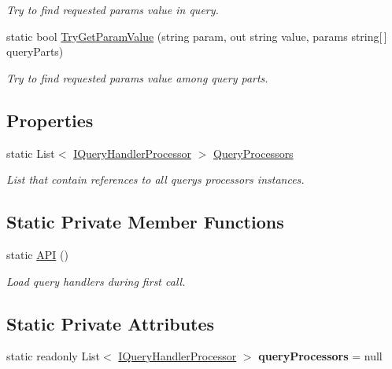 \begin{DoxyCompactItemize}
\begin{DoxyCompactList}\small\item\em Try to find requested param\textquotesingle{}s value in query. \end{DoxyCompactList}\item 
static bool \mbox{\hyperlink{class_uniform_queries_1_1_a_p_i_a5747ff73a111b583fa01c442ca2a2d78}{Try\+Get\+Param\+Value}} (string param, out string value, params string\mbox{[}$\,$\mbox{]} query\+Parts)
\begin{DoxyCompactList}\small\item\em Try to find requested param\textquotesingle{}s value among query parts. \end{DoxyCompactList}\end{DoxyCompactItemize}
\subsection*{Properties}
\begin{DoxyCompactItemize}
\item 
static List$<$ \mbox{\hyperlink{interface_uniform_queries_1_1_i_query_handler_processor}{I\+Query\+Handler\+Processor}} $>$ \mbox{\hyperlink{class_uniform_queries_1_1_a_p_i_a8fe90206df6a1ae2b052b82c30a32037}{Query\+Processors}}
\begin{DoxyCompactList}\small\item\em List that contain references to all query\textquotesingle{}s processors instances. \end{DoxyCompactList}\end{DoxyCompactItemize}
\subsection*{Static Private Member Functions}
\begin{DoxyCompactItemize}
\item 
static \mbox{\hyperlink{class_uniform_queries_1_1_a_p_i_a8dbe3d00dcf507ab3cea1dc58e1e154f}{A\+PI}} ()
\begin{DoxyCompactList}\small\item\em Load query handlers during first call. \end{DoxyCompactList}\end{DoxyCompactItemize}
\subsection*{Static Private Attributes}
\begin{DoxyCompactItemize}
\item 
\mbox{\label{class_uniform_queries_1_1_a_p_i_a4af16485a14a5acbd5ac442cf0467496}} 
static readonly List$<$ \mbox{\hyperlink{interface_uniform_queries_1_1_i_query_handler_processor}{I\+Query\+Handler\+Processor}} $>$ {\bfseries query\+Processors} = null
\end{DoxyCompactItemize}


